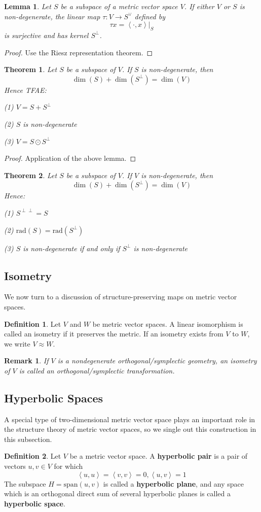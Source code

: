 \documentclass{book}
\newtheorem{theorem}{Theorem}[section]
\newtheorem{lemma}{Lemma}[section]
\newtheorem*{remark}{Remark}
\theoremstyle{definition}
\newtheorem{definition}{Definition}[section]
\begin{document}
\begin{lemma}
Let $S$ be a subspace of a metric vector space $V$. If either $V$ or $S$ is non-degenerate, the linear map $\tau:V\to S^\vee $ defined by \[\tau x=\left\langle \cdot,x\right\rangle|_S\]
is surjective and has kernel $S^\perp$.
\end{lemma}
\begin{proof}
Use the Riesz representation theorem.
\end{proof}
\begin{theorem}
Let $S$ be a subspace of $V$. If $S$ is non-degenerate, then \[\dim(S)+\dim(S^\perp)=\dim(V)\] Hence TFAE:\par
(1) $V=S+S^\perp$\par
(2) $S$ is non-degenerate\par
(3) $V=S\odot S^\perp$
\end{theorem}
\begin{proof}
Application of the above lemma.
\end{proof}
\begin{theorem}
Let $S$ be a subspace of $V$. If $V$ is non-degenerate, then \[\dim(S)+\dim(S^\perp)=\dim(V)\] Hence:\par
(1) $S^{\perp\perp}=S$\par
(2) $\text{rad}(S)=\text{rad}(S^\perp)$\par
(3) $S$ is non-degenerate if and only if $S^\perp$ is non-degenerate
\end{theorem}
\subsection{Isometry}
We now turn to a discussion of structure-preserving maps on metric vector spaces.
\begin{definition}
Let $V$ and $W$ be metric vector spaces. A linear isomorphism is called an isometry if it preserves the metric. If an isometry exists from $V$ to $W$, we write $V\approx W$.
\end{definition}
\begin{remark}
If $V$ is a nondegenerate orthogonal/symplectic geometry, an isometry of $V$ is called an orthogonal/symplectic transformation.
\end{remark}
\subsection{Hyperbolic Spaces}
A special type of two-dimensional metric vector space plays an important role in the structure theory of metric vector spaces, so we single out this construction in this subsection.
\begin{definition}
Let $V$ be a metric vector space. A \textbf{hyperbolic pair} is a pair of vectors $u,v\in V$ for which \[\left \langle u,u \right \rangle =\left \langle v,v \right \rangle =0,\left \langle u,v \right \rangle=1 \]
The subspace $H=\text{span}(u,v)$ is called a \textbf{hyperbolic plane}, and any space which is an orthogonal direct sum of several hyperbolic planes is called a \textbf{hyperbolic space}. 
\end{definition}
\end{document}
